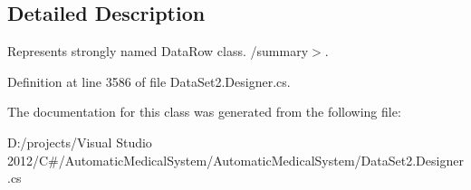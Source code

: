 \subsection{Detailed Description}
Represents strongly named DataRow class. /summary$>$. 

Definition at line 3586 of file DataSet2.Designer.cs.

The documentation for this class was generated from the following file:\begin{CompactItemize}
\item 
D:/projects/Visual Studio 2012/C\#/AutomaticMedicalSystem/AutomaticMedicalSystem/DataSet2.Designer.cs\end{CompactItemize}

